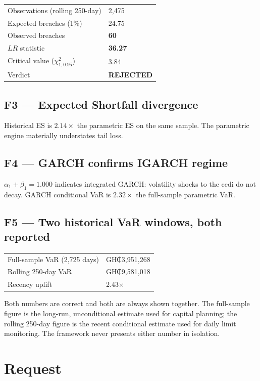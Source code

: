 \documentclass[11pt,a4paper]{article}
\begin{document}
\begin{tabularx}{\textwidth}{@{}lX@{}}
\toprule
Observations (rolling 250-day) & 2{,}475 \\
Expected breaches (1\%) & 24.75 \\
Observed breaches & \textbf{60} \\
$LR$ statistic & \textbf{36.27} \\
Critical value ($\chi^2_{1,0.95}$) & 3.84 \\
Verdict & \textbf{REJECTED} \\
\bottomrule
\end{tabularx}

\subsection*{F3 --- Expected Shortfall divergence}

Historical ES is $2.14\times$ the parametric ES on the same sample.
The parametric engine materially understates tail loss.

\subsection*{F4 --- GARCH confirms IGARCH regime}

$\alpha_1 + \beta_1 = 1.000$ indicates integrated GARCH: volatility
shocks to the cedi do not decay. GARCH conditional VaR is $2.32\times$
the full-sample parametric VaR.

\subsection*{F5 --- Two historical VaR windows, both reported}

\begin{tabularx}{\textwidth}{@{}lX@{}}
\toprule
Full-sample VaR (2{,}725 days) & GH₵3{,}951{,}268 \\
Rolling 250-day VaR & GH₵9{,}581{,}018 \\
Recency uplift & 2.43\(\times\) \\
\bottomrule
\end{tabularx}

Both numbers are correct and both are always shown together. The
full-sample figure is the long-run, unconditional estimate used for
capital planning; the rolling 250-day figure is the recent conditional
estimate used for daily limit monitoring. The framework never presents
either number in isolation.

\section*{Request}
\end{document}
